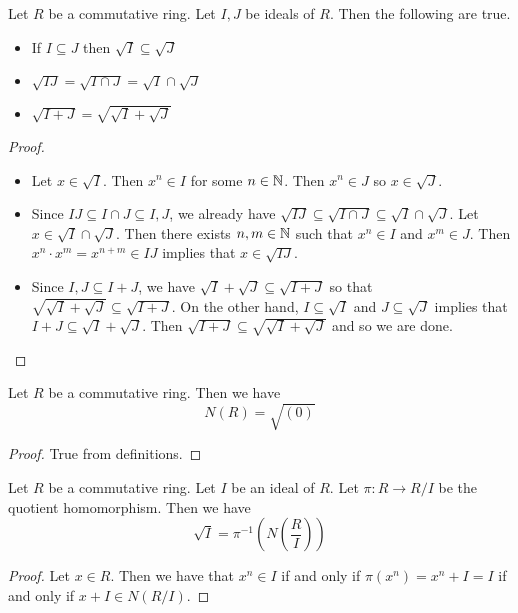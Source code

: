 \documentclass[a4paper]{article}
\begin{document}
\begin{prp}{}{} Let $R$ be a commutative ring. Let $I,J$ be ideals of $R$. Then the following are true. 
\begin{itemize}
\item If $I\subseteq J$ then $\sqrt{I}\subseteq\sqrt{J}$
\item $\sqrt{IJ}=\sqrt{I\cap J}=\sqrt{I}\cap\sqrt{J}$
\item $\sqrt{I+J}=\sqrt{\sqrt{I}+\sqrt{J}}$
\end{itemize} 
\begin{proof}~\\
\begin{itemize}
\item Let $x\in\sqrt{I}$. Then $x^n\in I$ for some $n\in\mathbb{N}$. Then $x^n\in J$ so $x\in\sqrt{J}$. 
\item Since $IJ\subseteq I\cap J\subseteq I,J$, we already have $\sqrt{IJ}\subseteq\sqrt{I\cap J}\subseteq\sqrt{I}\cap\sqrt{J}$. Let $x\in\sqrt{I}\cap\sqrt{J}$. Then there exists $n,m\in\mathbb{N}$ such that $x^n\in I$ and $x^m\in J$. Then $x^n\cdot x^m=x^{n+m}\in IJ$ implies that $x\in\sqrt{IJ}$. 
\item Since $I,J\subseteq I+J$, we have $\sqrt{I}+\sqrt{J}\subseteq\sqrt{I+J}$ so that $\sqrt{\sqrt{I}+\sqrt{J}}\subseteq\sqrt{I+J}$. On the other hand, $I\subseteq\sqrt{I}$ and $J\subseteq\sqrt{J}$ implies that $I+J\subseteq\sqrt{I}+\sqrt{J}$. Then $\sqrt{I+J}\subseteq\sqrt{\sqrt{I}+\sqrt{J}}$ and so we are done. 
\end{itemize}
\end{proof}
\end{prp}

\begin{lmm}{}{} Let $R$ be a commutative ring. Then we have $$N(R)=\sqrt{(0)}$$ 
\begin{proof}
True from definitions. 
\end{proof}
\end{lmm}

\begin{lmm}{}{} Let $R$ be a commutative ring. Let $I$ be an ideal of $R$. Let $\pi:R\to R/I$ be the quotient homomorphism. Then we have $$\sqrt{I}=\pi^{-1}\left(N\left(\frac{R}{I}\right)\right)$$ 
\begin{proof}
Let $x\in R$. Then we have that $x^n\in I$ if and only if $\pi(x^n)=x^n+I=I$ if and only if $x+I\in N(R/I)$. 
\end{proof}
\end{lmm}
\end{document}
